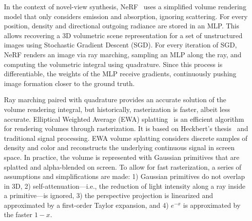In the context of novel-view synthesis, NeRF~\cite{mildenhall2020nerf} uses a simplified volume rendering model that only considers emission and absorption, ignoring scattering. %
For every position, density and directional outgoing radiance are stored in an MLP. This allows recovering
a 3D volumetric scene representation for a set of unstructured images using Stochastic Gradient Descent (SGD). For every iteration of SGD, NeRF renders an image via ray marching, sampling an MLP along the ray, and computing the volumetric integral using quadrature. 
Since this process is differentiable, the weights of the MLP receive gradients, continuously pushing image formation closer to the ground truth. 

Ray marching paired with quadrature provides an accurate solution of the volume rendering integral, but historically, rasterization is faster, albeit less accurate. Elliptical Weighted Average (EWA) splatting~\cite{ewa_splatting} is an efficient algorithm for rendering volumes through rasterization. It is based on Heckbert's thesis~\cite{heckbert1989fundamentals} and traditional signal processing. EWA volume splatting considers discrete samples of density and color and reconstructs the underlying continuous signal in screen space. In practice, the volume is represented with Gaussian primitives that are splatted and alpha-blended on screen. To allow for fast rasterization, a series of assumptions and simplifications are made: 1) Gaussian primitives do not overlap in 3D, 2) self-attenuation---i.e., the reduction of light intensity along a ray inside a primitive---is ignored, 3) the perspective projection is linearized and approximated by a first-order Taylor expansion, and 4) $e^{-x}$ is approximated by the faster $1-x$.

